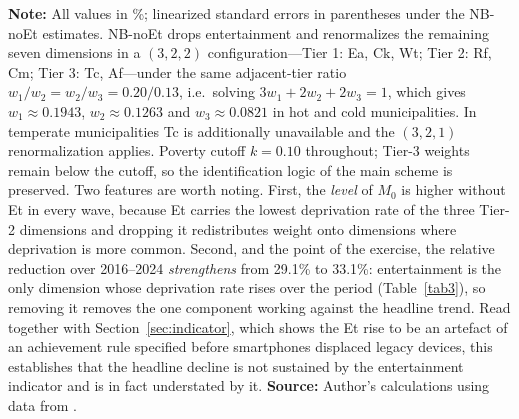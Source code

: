 \documentclass[11pt, a4paper]{article}
\begin{document}
\begin{table}[htb]
\begin{justify}
\textbf{Note:} All values in \%; linearized standard errors in parentheses under the NB-noEt estimates. NB-noEt drops entertainment and renormalizes the remaining seven dimensions in a $(3,2,2)$ configuration---Tier 1: Ea, Ck, Wt; Tier 2: Rf, Cm; Tier 3: Tc, Af---under the same adjacent-tier ratio $w_1/w_2 = w_2/w_3 = 0.20/0.13$, i.e.\ solving $3w_1 + 2w_2 + 2w_3 = 1$, which gives $w_1 \approx 0.1943$, $w_2 \approx 0.1263$ and $w_3 \approx 0.0821$ in hot and cold municipalities. In temperate municipalities Tc is additionally unavailable and the $(3,2,1)$ renormalization applies. Poverty cutoff $k=0.10$ throughout; Tier-3 weights remain below the cutoff, so the identification logic of the main scheme is preserved. Two features are worth noting. First, the \emph{level} of $M_0$ is higher without Et in every wave, because Et carries the lowest deprivation rate of the three Tier-2 dimensions and dropping it redistributes weight onto dimensions where deprivation is more common. Second, and the point of the exercise, the relative reduction over 2016--2024 \emph{strengthens} from 29.1\% to 33.1\%: entertainment is the only dimension whose deprivation rate rises over the period (Table~\ref{tab3}), so removing it removes the one component working against the headline trend. Read together with Section~\ref{sec:indicator}, which shows the Et rise to be an artefact of an achievement rule specified before smartphones displaced legacy devices, this establishes that the headline decline is not sustained by the entertainment indicator and is in fact understated by it. \textbf{Source:} Author's calculations using data from \textcite{enigh2016, enigh2018, enigh2020, enigh2022, enigh2024}.
\end{justify}
\label{tab:et_drop}
\end{table}
\end{document}
